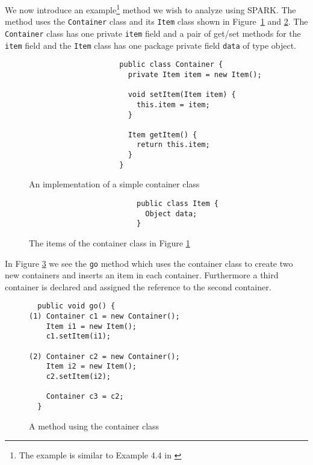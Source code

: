 \documentclass{article}
\newcommand{\code}[1]{\texttt{\small #1}}
\begin{document}
We now introduce an example\footnote{The example is similar to
Example 4.4 in \cite{lhotak-phd}} method we wish to analyze using
SPARK. The method uses the \code{Container} class and its \code{Item}
class shown in Figure~\ref{fig:container:class} and
\ref{fig:item:class}. The \code{Container} class has one private
\code{item} field and a pair of get/set methods for the \code{item}
field and the \code{Item} class has one package private field
\code{data} of type object.

\begin{figure}[htb]
  \centering
  \begin{verbatim}
                     public class Container {
                       private Item item = new Item();

                       void setItem(Item item) {
                         this.item = item;
                       }
  
                       Item getItem() {
                         return this.item;
                       }
                     }
  \end{verbatim}
  \caption{An implementation of a simple container class}
  \label{fig:container:class}
\end{figure}

\begin{figure}[htb]
  \centering
  \begin{verbatim}
                         public class Item {
                           Object data;
                         }
  \end{verbatim}
  \caption{The items of the container class in Figure \ref{fig:container:class}}
  \label{fig:item:class}
\end{figure}

In Figure \ref{fig:test1:go} we see the \code{go} method which uses the
container class to create two new containers and inserts an item in
each container. Furthermore a third container is declared and assigned
the reference to the second container.

\begin{figure}[htb]
  \centering
  \begin{verbatim}
  public void go() {
(1) Container c1 = new Container();
    Item i1 = new Item();
    c1.setItem(i1);
                
(2) Container c2 = new Container();
    Item i2 = new Item();
    c2.setItem(i2);     
                
    Container c3 = c2;
  }
  \end{verbatim}
  \caption{A method using the container class}
  \label{fig:test1:go}
\end{figure}
\end{document}
